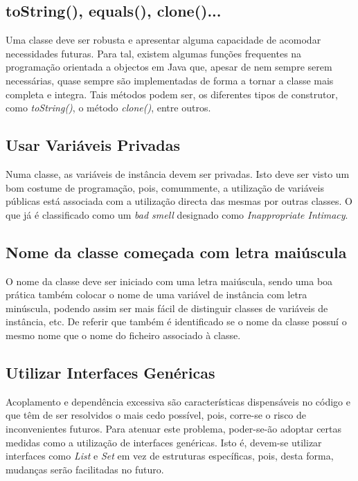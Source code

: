 \subsection{toString(), equals(), clone()...}

\hspace{5mm} Uma classe deve ser robusta e apresentar alguma capacidade  de acomodar necessidades futuras. Para tal, existem algumas funções frequentes na programação orientada a objectos em Java que, apesar de nem sempre serem necessárias, quase sempre são implementadas de forma a tornar a classe mais completa e integra. Tais métodos podem ser, os diferentes tipos de construtor, como \textit{toString()}, o método \textit{clone()}, entre outros.

\subsection{Usar Variáveis Privadas}

\hspace{5mm} Numa classe, as variáveis de instância devem ser privadas. Isto deve ser visto um bom costume de programação, pois, comummente, a utilização de variáveis públicas está associada com a utilização directa das mesmas por outras classes. O que já é classificado como um \textit{bad smell} designado como \textit{Inappropriate Intimacy}.

\subsection{Nome da classe começada com letra maiúscula}

\hspace{5mm} O nome da classe deve ser iniciado com uma letra maiúscula, sendo uma boa prática também colocar o nome de uma variável de instância com letra minúscula, podendo assim ser mais fácil de distinguir classes de variáveis de instância, etc. De referir que também é identificado se o nome da classe possuí o mesmo nome que o nome do ficheiro associado à classe.

\subsection{Utilizar Interfaces Genéricas}

\hspace{5mm} Acoplamento e dependência excessiva são características dispensáveis no código e que têm de ser resolvidos o mais cedo possível, pois, corre-se o risco de inconvenientes futuros. Para atenuar este problema, poder-se-ão adoptar certas medidas como a utilização de interfaces genéricas. Isto é, devem-se utilizar interfaces como \textit{List} e \textit{Set} em vez de estruturas específicas, pois, desta forma, mudanças serão facilitadas no futuro.

